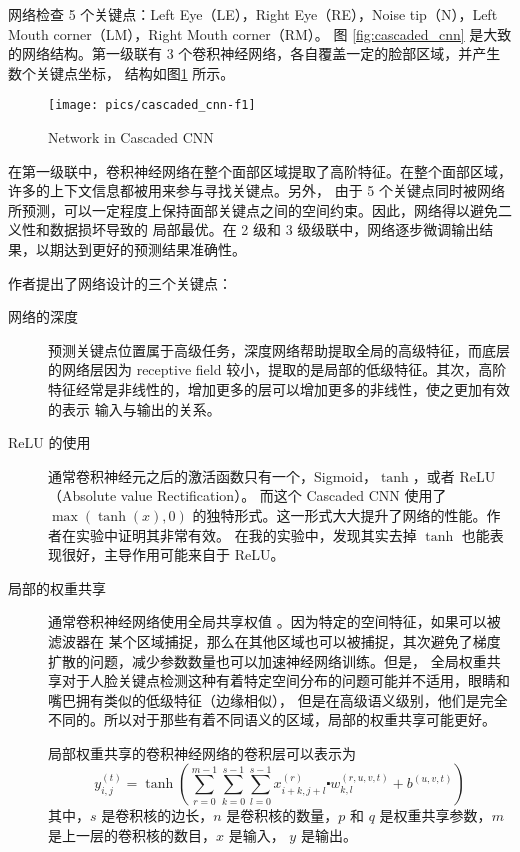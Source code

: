 \documentclass{ctexart}
\begin{document}
网络检查 5 个关键点：Left Eye（LE），Right Eye（RE），Noise tip（N），Left Mouth corner（LM），Right Mouth corner（RM）。
图 \ref{fig:cascaded_cnn} 是大致的网络结构。第一级联有 3 个卷积神经网络，各自覆盖一定的脸部区域，并产生数个关键点坐标，
结构如图\ref{fig:cascaded_cnn-f1} 所示。

\begin{figure}
	\centering
	\texttt{[image: pics/cascaded\_cnn-f1]}
	\caption[]{Network in Cascaded CNN}
	\label{fig:cascaded_cnn-f1}
\end{figure}

在第一级联中，卷积神经网络在整个面部区域提取了高阶特征。在整个面部区域，许多的上下文信息都被用来参与寻找关键点。另外，
由于 5 个关键点同时被网络所预测，可以一定程度上保持面部关键点之间的空间约束。因此，网络得以避免二义性和数据损坏导致的
局部最优。在 2 级和 3 级级联中，网络逐步微调输出结果，以期达到更好的预测结果准确性。

作者提出了网络设计的三个关键点：

\begin{description}
	\item [网络的深度] 预测关键点位置属于高级任务，深度网络帮助提取全局的高级特征，而底层的网络层因为 receptive field
	较小，提取的是局部的低级特征。其次，高阶特征经常是非线性的，增加更多的层可以增加更多的非线性，使之更加有效的表示
	输入与输出的关系。
	\item [ReLU 的使用] 通常卷积神经元之后的激活函数只有一个，Sigmoid，$\tanh$，或者 ReLU （Absolute value Rectification）。
	而这个 Cascaded CNN 使用了 $\max(\tanh(x), 0)$ 的独特形式。这一形式大大提升了网络的性能。作者在实验中证明其非常有效。
	在我的实验中，发现其实去掉 $\tanh$ 也能表现很好，主导作用可能来自于 ReLU。
	\item [局部的权重共享] 通常卷积神经网络使用全局共享权值 \cite{lff-conv}。因为特定的空间特征，如果可以被滤波器在
	某个区域捕捉，那么在其他区域也可以被捕捉，其次避免了梯度扩散的问题，减少参数数量也可以加速神经网络训练。但是，
	全局权重共享对于人脸关键点检测这种有着特定空间分布的问题可能并不适用，眼睛和嘴巴拥有类似的低级特征（边缘相似），
	但是在高级语义级别，他们是完全不同的。所以对于那些有着不同语义的区域，局部的权重共享可能更好。

	局部权重共享的卷积神经网络的卷积层可以表示为
	$$
	y_{i, j}^{(t)} = \tanh \left(
	\sum_{r=0}^{m-1} \sum_{k=0}^{s-1} \sum_{l=0}^{s-1} x_{i+k, j+l}^{(r)} \centerdot
	w_{k, l}^{(r, u, v, t)} + b^{(u, v, t)}
	\right)
	$$
	其中，$s$ 是卷积核的边长，$n$ 是卷积核的数量，$p$ 和 $q$ 是权重共享参数，$m$ 是上一层的卷积核的数目，$x$ 是输入，
	$y$ 是输出。
\end{description}
\end{document}
